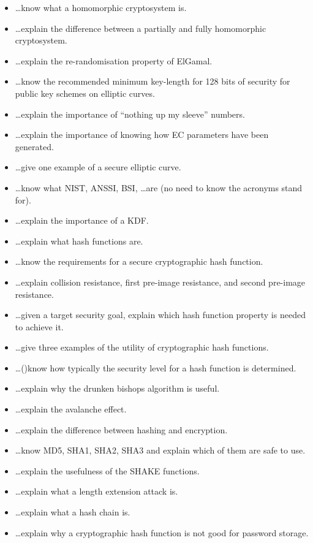 \documentclass[usegeometry,parskip=half]{scrartcl}
\begin{document}
\begin{itemize}
  \item \dots{}know what a homomorphic cryptosystem is.
  \item \dots{}explain the difference between a partially and fully homomorphic cryptosystem.
  \item \dots{}explain the re-randomisation property of ElGamal.
  \item \dots{}know the recommended minimum key-length for 128 bits of security for public key schemes on elliptic curves.
  \item \dots{}explain the importance of \enquote{nothing up my sleeve} numbers.
  \item \dots{}explain the importance of knowing how EC parameters have been generated.
  \item \dots{}give one example of a secure elliptic curve.
  \item \dots{}know what NIST, ANSSI, BSI, \dots are (no need to know the acronyms stand for).
  \item \dots{}explain the importance of a KDF.
  \item \dots{}explain what hash functions are.
  \item \dots{}know the requirements for a secure cryptographic hash function.
  \item \dots{}explain collision resistance, first pre-image resistance, and second pre-image resistance.
  \item \dots{}given a target security goal, explain which hash function property is needed to achieve it.
  \item \dots{}give three examples of the utility of cryptographic hash functions.
  \item \dots()know how typically the security level for a hash function is determined.
  \item \dots{}explain why the drunken bishops algorithm is useful.
  \item \dots{}explain the avalanche effect.
  \item \dots{}explain the difference between hashing and encryption.
  \item \dots{}know MD5, SHA1, SHA2, SHA3 and explain which of them are safe to use.
  \item \dots{}explain the usefulness of the SHAKE functions.
  \item \dots{}explain what a length extension attack is.
  \item \dots{}explain what a hash chain is.
  \item \dots{}explain why a cryptographic hash function is not good for password storage.

\end{itemize}
\end{document}
